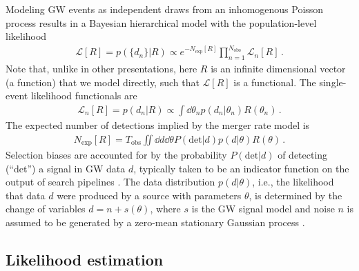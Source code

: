 \begin{refsection}
Modeling GW events as independent draws from an inhomogenous Poisson process results in a Bayesian hierarchical model with the population-level likelihood \cite{Mandel:2018mve, Thrane:2018qnx, Vitale2020, Essick:2023upv}
\begin{align}
\label{eq: likelihood}
\mathcal{L}[R]
=
p ( \{ d_n \} | R )
\propto
e^{ -N_\mathrm{exp} [ R ] }
\prod_{n=1}^{N_\mathrm{obs}} \mathcal{L}_n[R]
\, .
\end{align}
Note that, unlike in other presentations, here $R$ is an infinite dimensional vector (a function) that we model directly, such that $\mathcal{L} [ R ]$ is a functional.
The single-event likelihood functionals are
\begin{align}
\mathcal{L}_n[R]
=
p ( d_n | R )
\propto
\int \dd{\theta_n} p ( d_n | \theta_n ) R ( \theta_n )
\, .
\label{eq: single event likelihood}
\end{align}
The expected number of detections implied by the merger rate model is
\begin{align}
\label{eq: Nexp}
N_\mathrm{exp} [ R ]
=
T_\mathrm{obs}
\iint \dd{d} \dd{\theta}
P ( \mathrm{det} | d )  p ( d | \theta ) R ( \theta )
\, .
\end{align}
Selection biases are accounted for by the probability  $P(\mathrm{det}|d)$ of detecting (``det'') a signal in GW data $d$, typically taken to be an indicator function on the output of search pipelines \cite{KAGRA:2021duu, Essick:2023upv}. The data distribution $p(d|\theta)$, i.e., the likelihood that data $d$ were produced by a source with parameters $\theta$, is determined by the change of variables $d = n + s(\theta)$, where $s$ is the GW signal model and noise $n$ is assumed to be generated by a zero-mean stationary Gaussian process \cite{Finn:1992wt, Cutler:1994ys}.

\subsection{Likelihood estimation}
\label{sec: ppmethods Likelihood estimation}


\end{refsection}
